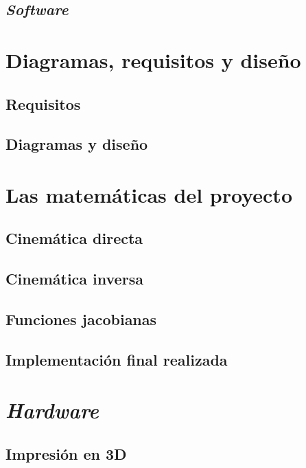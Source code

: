 \section{\textit{Software}}


\chapter{Diagramas, requisitos y diseño}

\section{Requisitos}

\section{Diagramas y diseño}


\chapter{Las matemáticas del proyecto}

\section{Cinemática directa}

\section{Cinemática inversa}

\section{Funciones jacobianas}

\section{Implementación final realizada}


\chapter{\textit{Hardware}}

\section{Impresión en 3D}

